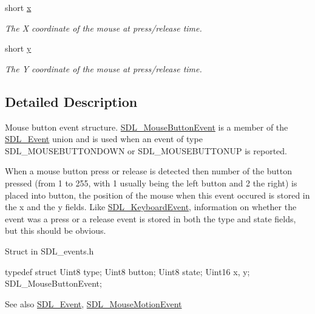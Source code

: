 \begin{DoxyCompactItemize}
short \hyperlink{struct_tao_1_1_sdl_1_1_sdl_1_1_s_d_l___mouse_button_event_a763a7a3847b0348d2353c33207c6ffea}{x}
\begin{DoxyCompactList}\small\item\em The X coordinate of the mouse at press/release time. \item\end{DoxyCompactList}\item 
short \hyperlink{struct_tao_1_1_sdl_1_1_sdl_1_1_s_d_l___mouse_button_event_a287e7c64bf03edbeb1cb8044ae0455b7}{y}
\begin{DoxyCompactList}\small\item\em The Y coordinate of the mouse at press/release time. \item\end{DoxyCompactList}\end{DoxyCompactItemize}


\subsection{Detailed Description}
Mouse button event structure. \hyperlink{struct_tao_1_1_sdl_1_1_sdl_1_1_s_d_l___mouse_button_event}{SDL\_\-MouseButtonEvent} is a member of the \hyperlink{struct_tao_1_1_sdl_1_1_s_d_l___event}{SDL\_\-Event} union and is used when an event of type SDL\_\-MOUSEBUTTONDOWN or SDL\_\-MOUSEBUTTONUP is reported. 

When a mouse button press or release is detected then number of the button pressed (from 1 to 255, with 1 usually being the left button and 2 the right) is placed into button, the position of the mouse when this event occured is stored in the x and the y fields. Like \hyperlink{struct_tao_1_1_sdl_1_1_sdl_1_1_s_d_l___keyboard_event}{SDL\_\-KeyboardEvent}, information on whether the event was a press or a release event is stored in both the type and state fields, but this should be obvious.  

Struct in SDL\_\-events.h 
\begin{DoxyCode}
            typedef struct{
                        Uint8 type;
                        Uint8 button;
                        Uint8 state;
                        Uint16 x, y;
                } SDL_MouseButtonEvent;
\end{DoxyCode}
 

\begin{DoxySeeAlso}{See also}
\hyperlink{struct_tao_1_1_sdl_1_1_s_d_l___event}{SDL\_\-Event}, \hyperlink{struct_tao_1_1_sdl_1_1_sdl_1_1_s_d_l___mouse_motion_event}{SDL\_\-MouseMotionEvent}


\end{DoxySeeAlso}


